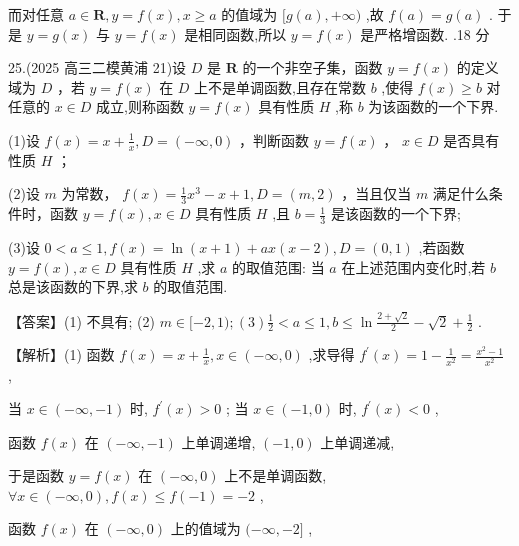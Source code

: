 \documentclass[10pt]{article}
\begin{document}
而对任意 \(a \in  \mathbf{R},y = f\left( x\right) ,x \geq  a\) 的值域为 \(\lbrack g\left( a\right) , + \infty )\) ,故 \(f\left( a\right)  = g\left( a\right)\) . 于是 \(y = g\left( x\right)\) 与 \(y = f\left( x\right)\) 是相同函数,所以 \(y = f\left( x\right)\) 是严格增函数. .18 分

25.(2025 高三二模黄浦 21)设 \(D\) 是 \(\mathbf{R}\) 的一个非空子集，函数 \(y = f\left( x\right)\) 的定义域为 \(D\) ，若 \(y = f\left( x\right)\) 在 \(D\) 上不是单调函数,且存在常数 \(b\) ,使得 \(f\left( x\right)  \geq  b\) 对任意的 \(x \in  D\) 成立,则称函数 \(y = f\left( x\right)\) 具有性质 \(H\) ,称 \(b\) 为该函数的一个下界.

(1)设 \(f\left( x\right)  = x + \frac{1}{x},D = \left( {-\infty ,0}\right)\) ，判断函数 \(y = f\left( x\right)\) ， \(x \in  D\) 是否具有性质 \(H\) ；

(2)设 \(m\) 为常数， \(f\left( x\right)  = \frac{1}{3}{x}^{3} - x + 1,D = \left( {m,2}\right)\) ，当且仅当 \(m\) 满足什么条件时，函数 \(y = f\left( x\right) ,x \in  D\) 具有性质 \(H\) ,且 \(b = \frac{1}{3}\) 是该函数的一个下界;

(3)设 \(0 < a \leq  1,f\left( x\right)  = \ln \left( {x + 1}\right)  + {ax}\left( {x - 2}\right) ,D = \left( {0,1}\right)\) ,若函数 \(y = f\left( x\right) ,x \in  D\) 具有性质 \(H\) ,求 \(a\) 的取值范围: 当 \(a\) 在上述范围内变化时,若 \(b\) 总是该函数的下界,求 \(b\) 的取值范围.

【答案】(1) 不具有; (2) \(m \in  \lbrack  - 2,1);\left( 3\right) \frac{1}{2} < a \leq  1,b \leq  \ln \frac{2 + \sqrt{2}}{2} - \sqrt{2} + \frac{1}{2}\) .

【解析】(1) 函数 \(f\left( x\right)  = x + \frac{1}{x},x \in  \left( {-\infty ,0}\right)\) ,求导得 \({f}^{\prime }\left( x\right)  = 1 - \frac{1}{{x}^{2}} = \frac{{x}^{2} - 1}{{x}^{2}}\) ,

当 \(x \in  \left( {-\infty , - 1}\right)\) 时, \({f}^{\prime }\left( x\right)  > 0\) ; 当 \(x \in  \left( {-1,0}\right)\) 时, \({f}^{\prime }\left( x\right)  < 0\) ,

函数 \(f\left( x\right)\) 在 \(\left( {-\infty , - 1}\right)\) 上单调递增, \(\left( {-1,0}\right)\) 上单调递减,

于是函数 \(y = f\left( x\right)\) 在 \(\left( {-\infty ,0}\right)\) 上不是单调函数, \(\forall x \in  \left( {-\infty ,0}\right) ,f\left( x\right)  \leq  f\left( {-1}\right)  =  - 2\) ,

函数 \(f\left( x\right)\) 在 \(\left( {-\infty ,0}\right)\) 上的值域为 \(( - \infty , - 2\rbrack\) ,
\end{document}
